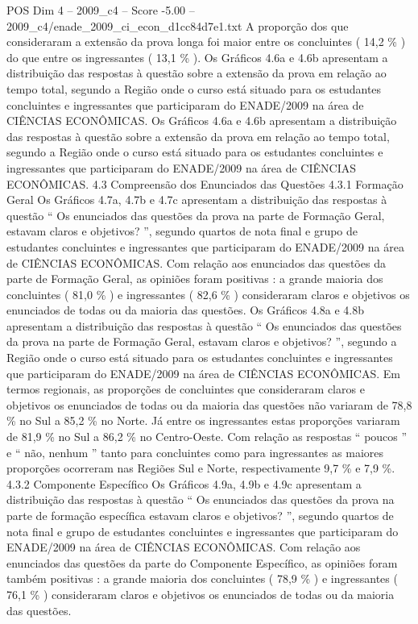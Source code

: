 \begin{textsample}{POS Dim 4 – 2009\_c4 – Score -5.00 – 2009\_c4/enade\_2009\_ci\_econ\_d1cc84d7e1.txt}
A proporção dos que consideraram a extensão da prova longa foi maior entre os concluintes ( 14,2 \% ) do que entre os ingressantes ( 13,1 \% ).
Os Gráficos 4.6a e 4.6b apresentam a distribuição das respostas à questão sobre a extensão da prova em relação ao tempo total, segundo a Região onde o curso está situado para os estudantes concluintes e ingressantes que participaram do ENADE/2009 na área de CIÊNCIAS ECONÔMICAS.
Os Gráficos 4.6a e 4.6b apresentam a distribuição das respostas à questão sobre a extensão da prova em relação ao tempo total, segundo a Região onde o curso está situado para os estudantes concluintes e ingressantes que participaram do ENADE/2009 na área de CIÊNCIAS ECONÔMICAS. 4.3 Compreensão dos Enunciados das Questões 4.3.1 Formação Geral Os Gráficos 4.7a, 4.7b e 4.7c apresentam a distribuição das respostas à questão “ Os enunciados das questões da prova na parte de Formação Geral, estavam claros e objetivos? ”, segundo quartos de nota final e grupo de estudantes concluintes e ingressantes que participaram do ENADE/2009 na área de CIÊNCIAS ECONÔMICAS.
Com relação aos enunciados das questões da parte de Formação Geral, as opiniões foram positivas : a grande maioria dos concluintes ( 81,0 \% ) e ingressantes ( 82,6 \% ) consideraram claros e objetivos os enunciados de todas ou da maioria das questões.
Os Gráficos 4.8a e 4.8b apresentam a distribuição das respostas à questão “ Os enunciados das questões da prova na parte de Formação Geral, estavam claros e objetivos? ”, segundo a Região onde o curso está situado para os estudantes concluintes e ingressantes que participaram do ENADE/2009 na área de CIÊNCIAS ECONÔMICAS.
Em termos regionais, as proporções de concluintes que consideraram claros e objetivos os enunciados de todas ou da maioria das questões não variaram de 78,8 \% no Sul a 85,2 \% no Norte.
Já entre os ingressantes estas proporções variaram de 81,9 \% no Sul a 86,2 \% no Centro-Oeste.
Com relação as respostas “ poucos ” e “ não, nenhum ” tanto para concluintes como para ingressantes as maiores proporções ocorreram nas Regiões Sul e Norte, respectivamente 9,7 \% e 7,9 \%. 4.3.2 Componente Específico Os Gráficos 4.9a, 4.9b e 4.9c apresentam a distribuição das respostas à questão “ Os enunciados das questões da prova na parte de formação específica estavam claros e objetivos? ”, segundo quartos de nota final e grupo de estudantes concluintes e ingressantes que participaram do ENADE/2009 na área de CIÊNCIAS ECONÔMICAS.
Com relação aos enunciados das questões da parte do Componente Específico, as opiniões foram também positivas : a grande maioria dos concluintes ( 78,9 \% ) e ingressantes ( 76,1 \% ) consideraram claros e objetivos os enunciados de todas ou da maioria das questões.

\end{textsample}
